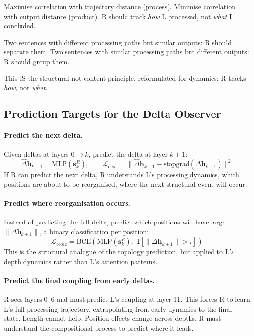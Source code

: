 \documentclass[11pt, a4paper]{article}
\newcommand{\h}{\mathbf{h}}
\theoremstyle{plain}
\theoremstyle{definition}
\theoremstyle{remark}
\begin{document}
Maximise correlation with trajectory distance (process).
Minimise correlation with output distance (product).
R should track \emph{how} L processed, not \emph{what} L concluded.

Two sentences with different processing paths but similar outputs: R should separate them.
Two sentences with similar processing paths but different outputs: R should group them.

This IS the structural-not-content principle, reformulated for dynamics: R tracks \emph{how}, not \emph{what}.

\subsection{Prediction Targets for the Delta Observer}

\paragraph{Predict the next delta.}
Given deltas at layers $0 \to k$, predict the delta at layer $k{+}1$:
\begin{equation}
\hat{\Delta}\h_{k+1} = \mathrm{MLP}(\mathbf{s}_k^R), \qquad \mathcal{L}_{\mathrm{next}} = \|\hat{\Delta}\h_{k+1} - \mathrm{stopgrad}(\Delta\h_{k+1})\|^2
\end{equation}
If R can predict the next delta, R understands L's processing dynamics, which positions are about to be reorganised, where the next structural event will occur.

\paragraph{Predict where reorganisation occurs.}
Instead of predicting the full delta, predict which positions will have large $\|\Delta\h_{k+1}\|$, a binary classification per position:
\begin{equation}
\mathcal{L}_{\mathrm{reorg}} = \mathrm{BCE}\!\left(\mathrm{MLP}(\mathbf{s}_k^R), \; \mathbf{1}[\|\Delta\h_{k+1}\| > \tau]\right)
\end{equation}
This is the structural analogue of the topology prediction, but applied to L's depth dynamics rather than L's attention patterns.

\paragraph{Predict the final coupling from early deltas.}
R sees layers 0--6 and must predict L's coupling at layer 11.
This forces R to learn L's full processing trajectory, extrapolating from early dynamics to the final state.
Length cannot help.
Position effects change across depths.
R must understand the compositional process to predict where it leads.
\end{document}
